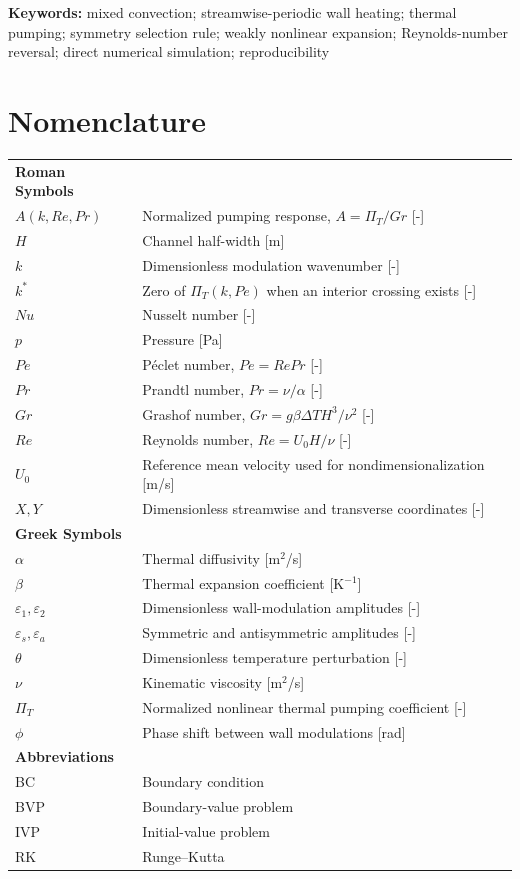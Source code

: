 \documentclass[12pt,a4paper]{article}
\newcommand{\Rey}{\mathit{Re}}
\newcommand{\Pe}{\mathit{Pe}}
\newcommand{\Grr}{\mathit{Gr}}
\newcommand{\Nu}{\mathit{Nu}}
\renewcommand{\Pr}{\mathit{Pr}}
\newcommand{\PiT}{\Pi_T}
\newenvironment{ruledtabular}{}{}
\begin{document}
\noindent\textbf{Keywords:} mixed convection; streamwise-periodic wall heating;
thermal pumping; symmetry selection rule; weakly nonlinear expansion;
Reynolds-number reversal; direct numerical simulation; reproducibility

\section*{Nomenclature}
\label{sec:nomenclature}
\begin{table}[htb]
\begin{ruledtabular}
\begin{tabular}{ll}
\textbf{Roman Symbols} & \\
$A(k,\Rey,\Pr)$ & Normalized pumping response, $A=\PiT/\Grr$ [-] \\
$H$ & Channel half-width [m] \\
$k$ & Dimensionless modulation wavenumber [-] \\
$k^*$ & Zero of $\PiT(k,\Pe)$ when an interior crossing exists [-] \\
$\Nu$ & Nusselt number [-] \\
$p$ & Pressure [Pa] \\
$\Pe$ & P\'eclet number, $\Pe=\Rey\Pr$ [-] \\
$\Pr$ & Prandtl number, $\Pr=\nu/\alpha$ [-] \\
$\Grr$ & Grashof number, $\Grr=g\beta\Delta T H^3/\nu^2$ [-] \\
$\Rey$ & Reynolds number, $\Rey=U_0H/\nu$ [-] \\
$U_0$ & Reference mean velocity used for nondimensionalization [m/s] \\
$X,Y$ & Dimensionless streamwise and transverse coordinates [-] \\
\textbf{Greek Symbols} & \\
$\alpha$ & Thermal diffusivity [m$^2$/s] \\
$\beta$ & Thermal expansion coefficient [K$^{-1}$] \\
$\varepsilon_1,\varepsilon_2$ & Dimensionless wall-modulation amplitudes [-] \\
$\varepsilon_s,\varepsilon_a$ & Symmetric and antisymmetric amplitudes [-] \\
$\theta$ & Dimensionless temperature perturbation [-] \\
$\nu$ & Kinematic viscosity [m$^2$/s] \\
$\PiT$ & Normalized nonlinear thermal pumping coefficient [-] \\
$\phi$ & Phase shift between wall modulations [rad] \\
\textbf{Abbreviations} & \\
BC & Boundary condition \\
BVP & Boundary-value problem \\
IVP & Initial-value problem \\
RK & Runge--Kutta \\
\end{tabular}
\end{ruledtabular}
\end{table}
\end{document}
